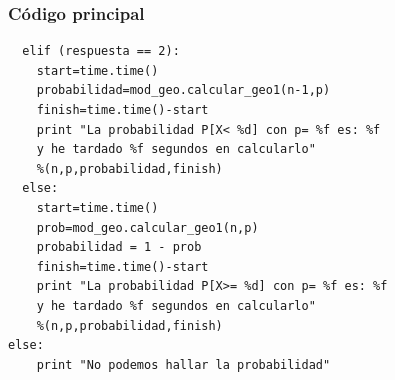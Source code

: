 \documentclass{beamer}
\begin{document}
\begin{frame}[fragile]
\frametitle{Código principal}
\scriptsize   %
\begin{verbatim}
  elif (respuesta == 2):
    start=time.time()
    probabilidad=mod_geo.calcular_geo1(n-1,p)
    finish=time.time()-start
    print "La probabilidad P[X< %d] con p= %f es: %f
    y he tardado %f segundos en calcularlo"
    %(n,p,probabilidad,finish)
  else:
    start=time.time()
    prob=mod_geo.calcular_geo1(n,p)
    probabilidad = 1 - prob
    finish=time.time()-start
    print "La probabilidad P[X>= %d] con p= %f es: %f
    y he tardado %f segundos en calcularlo"
    %(n,p,probabilidad,finish)
else:
    print "No podemos hallar la probabilidad"
\end{verbatim}
\hyperlink{Liga4}{}
\hypertarget<2>{Liga3}{}
\end{frame}
\end{document}
